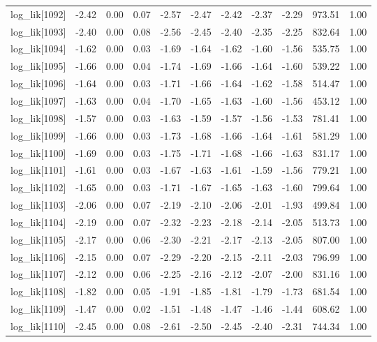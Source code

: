 \begin{table}[ht]
\begin{tabular}{rrrrrrrrrrr}
  log\_lik[1092] & -2.42 & 0.00 & 0.07 & -2.57 & -2.47 & -2.42 & -2.37 & -2.29 & 973.51 & 1.00 \\ 
  log\_lik[1093] & -2.40 & 0.00 & 0.08 & -2.56 & -2.45 & -2.40 & -2.35 & -2.25 & 832.64 & 1.00 \\ 
  log\_lik[1094] & -1.62 & 0.00 & 0.03 & -1.69 & -1.64 & -1.62 & -1.60 & -1.56 & 535.75 & 1.00 \\ 
  log\_lik[1095] & -1.66 & 0.00 & 0.04 & -1.74 & -1.69 & -1.66 & -1.64 & -1.60 & 539.22 & 1.00 \\ 
  log\_lik[1096] & -1.64 & 0.00 & 0.03 & -1.71 & -1.66 & -1.64 & -1.62 & -1.58 & 514.47 & 1.00 \\ 
  log\_lik[1097] & -1.63 & 0.00 & 0.04 & -1.70 & -1.65 & -1.63 & -1.60 & -1.56 & 453.12 & 1.00 \\ 
  log\_lik[1098] & -1.57 & 0.00 & 0.03 & -1.63 & -1.59 & -1.57 & -1.56 & -1.53 & 781.41 & 1.00 \\ 
  log\_lik[1099] & -1.66 & 0.00 & 0.03 & -1.73 & -1.68 & -1.66 & -1.64 & -1.61 & 581.29 & 1.00 \\ 
  log\_lik[1100] & -1.69 & 0.00 & 0.03 & -1.75 & -1.71 & -1.68 & -1.66 & -1.63 & 831.17 & 1.00 \\ 
  log\_lik[1101] & -1.61 & 0.00 & 0.03 & -1.67 & -1.63 & -1.61 & -1.59 & -1.56 & 779.21 & 1.00 \\ 
  log\_lik[1102] & -1.65 & 0.00 & 0.03 & -1.71 & -1.67 & -1.65 & -1.63 & -1.60 & 799.64 & 1.00 \\ 
  log\_lik[1103] & -2.06 & 0.00 & 0.07 & -2.19 & -2.10 & -2.06 & -2.01 & -1.93 & 499.84 & 1.00 \\ 
  log\_lik[1104] & -2.19 & 0.00 & 0.07 & -2.32 & -2.23 & -2.18 & -2.14 & -2.05 & 513.73 & 1.00 \\ 
  log\_lik[1105] & -2.17 & 0.00 & 0.06 & -2.30 & -2.21 & -2.17 & -2.13 & -2.05 & 807.00 & 1.00 \\ 
  log\_lik[1106] & -2.15 & 0.00 & 0.07 & -2.29 & -2.20 & -2.15 & -2.11 & -2.03 & 796.99 & 1.00 \\ 
  log\_lik[1107] & -2.12 & 0.00 & 0.06 & -2.25 & -2.16 & -2.12 & -2.07 & -2.00 & 831.16 & 1.00 \\ 
  log\_lik[1108] & -1.82 & 0.00 & 0.05 & -1.91 & -1.85 & -1.81 & -1.79 & -1.73 & 681.54 & 1.00 \\ 
  log\_lik[1109] & -1.47 & 0.00 & 0.02 & -1.51 & -1.48 & -1.47 & -1.46 & -1.44 & 608.62 & 1.00 \\ 
  log\_lik[1110] & -2.45 & 0.00 & 0.08 & -2.61 & -2.50 & -2.45 & -2.40 & -2.31 & 744.34 & 1.00 \\ 

\end{tabular}
\end{table}
